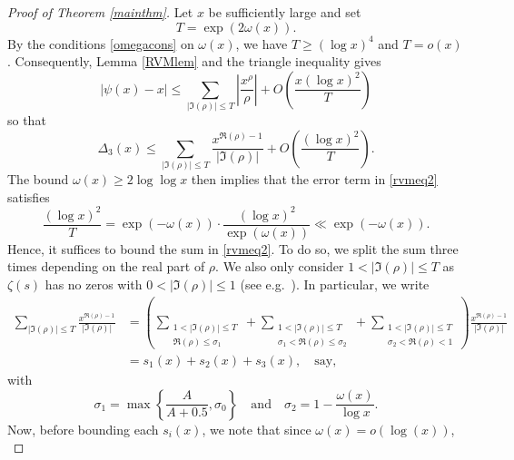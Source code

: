 \documentclass[reqno]{amsart}
\numberwithin{equation}{section}
\theoremstyle{remark}
\begin{document}
\begin{proof}[Proof of Theorem \ref{mainthm}]
   Let $x$ be sufficiently large and set 
    \begin{equation}\label{Tdef}
        T=\exp(2\omega(x)).
    \end{equation}
    By the conditions \eqref{omegacons} on $\omega(x)$, we have $T\geq (\log x)^4$ and $T=o(x)$. Consequently, Lemma \ref{RVMlem} and the triangle inequality gives
    \begin{equation*}
        |\psi(x)-x|\leq \sum_{|\Im(\rho)|\leq T}\left|\frac{x^{\rho}}{\rho}\right|+O\left(\frac{x(\log x)^2}{T}\right)
    \end{equation*}
    so that
    \begin{equation}\label{rvmeq2}
        \Delta_3(x)\leq \sum_{|\Im(\rho)|\leq T}\frac{x^{\Re(\rho)-1}}{|\Im(\rho)|}+O\left(\frac{(\log x)^2}{T}\right).
    \end{equation}
    The bound $\omega(x)\geq 2\log\log x$ then implies that the error term in \eqref{rvmeq2} satisfies
    \begin{equation*}
        \frac{(\log x)^2}{T}= \exp(-\omega(x))\cdot\frac{(\log x)^2}{\exp(\omega(x))}\ll \exp(-\omega(x)).
    \end{equation*}
    Hence, it suffices to bound the sum in \eqref{rvmeq2}. To do so, we split the sum three times depending on the real part of $\rho$. We also only consider $1<|\Im(\rho)|\leq T$ as $\zeta(s)$ has no zeros with $0<|\Im(\rho)|\leq 1$ (see e.g.\ \cite[Chapter 6]{edwards1974riemanns}). In particular, we write
    \begin{align*}
        \sum_{|\Im(\rho)|\leq T}\frac{x^{\Re(\rho)-1}}{|\Im(\rho)|}&=\left(\sum_{\substack{1<|\Im(\rho)|\leq T\\ \Re(\rho)\leq \sigma_1}} +\sum_{\substack{1<|\Im(\rho)|\leq T\\ \sigma_1<\Re(\rho)\leq \sigma_2}}+\sum_{\substack{1<|\Im(\rho)|\leq T\\ \sigma_2<\Re(\rho)<1}}\right)\frac{x^{\Re(\rho)-1}}{|\Im(\rho)|}\\
        &=s_1(x)+s_2(x)+s_3(x),\quad\text{say},
    \end{align*}
    with
    \begin{equation}\label{s1s2def}
        \sigma_1=\max\left\{\frac{A}{A+0.5},\sigma_0\right\}\quad\text{and}\quad\sigma_2=1-\frac{\omega(x)}{\log x}.
    \end{equation}
    Now, before bounding each $s_i(x)$, we note that since $\omega(x)=o(\log(x))$,
    \begin{equation*}

\end{equation*}
\end{proof}
\end{document}
